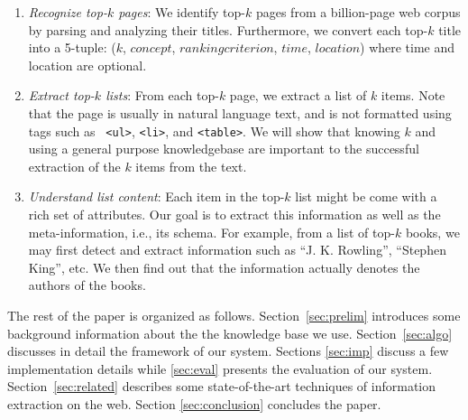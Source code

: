 \begin{enumerate}
\item \textit{Recognize top-$k$ pages}: We identify top-$k$ pages from
  a billion-page web corpus by parsing and analyzing their
  titles. Furthermore, we convert each top-$k$ title into a 5-tuple:
  ($k$, $concept$, $ranking criterion$, $time$, $location$)
  where time and location are optional.

\item \textit{Extract top-$k$ lists}: From each top-$k$ page, we
  extract a list of $k$ items. Note that the page is usually in
  natural language text, and is not formatted using tags such as {\tt
    <ul>}, {\tt <li>}, and {\tt <table>}. %
  We will show that knowing $k$ and using a general purpose
  knowledgebase are important to the successful
  extraction of the $k$ items from the text.

\item \textit{Understand list content}: %
  Each item in the top-$k$ list might be come with a rich set of
  attributes. Our goal is to extract this information as well as the
  meta-information, i.e., its schema. For example, from a list of
  top-$k$ books, we may first detect and extract information such as
  ``J. K. Rowling'', ``Stephen King'', etc. We then find out that the
  information actually denotes the authors of the books.
\end{enumerate}

The rest of the paper is organized as
follows.  Section~\ref{sec:prelim} introduces
some background information about the the knowledge base we use.
Section~\ref{sec:algo} discusses in detail the
framework of our system.  Sections \ref{sec:imp} discuss a few implementation
details while \ref{sec:eval} presents the evaluation of our system.
Section~\ref{sec:related} describes some state-of-the-art
techniques of information extraction on the
web. Section \ref{sec:conclusion} concludes the paper.


